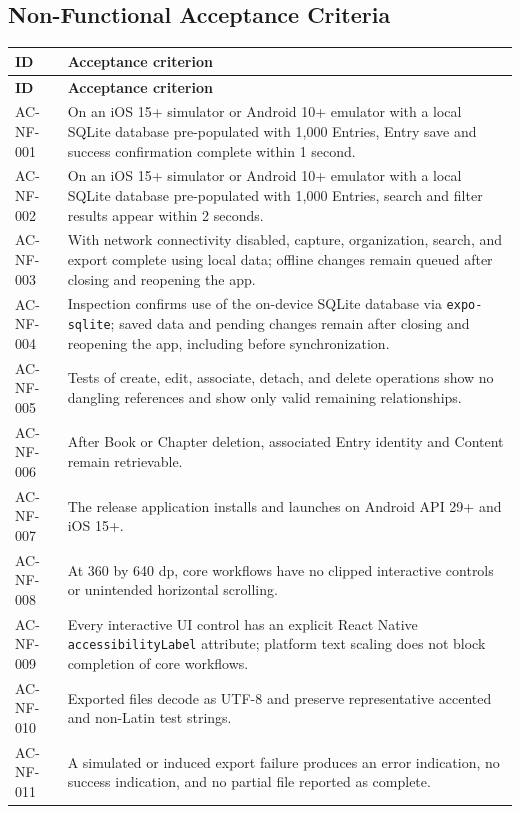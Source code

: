 \documentclass[11pt,a4paper]{article}
\begin{document}
\subsection{Non-Functional Acceptance Criteria}
\begin{longtable}{|L{2.5cm}|L{13.5cm}|}
\hline \textbf{ID} & \textbf{Acceptance criterion} \\
\hline
\endfirsthead
\hline \textbf{ID} & \textbf{Acceptance criterion} \\
\hline
\endhead
AC-NF-001 & On an iOS 15+ simulator or Android 10+ emulator with a local SQLite database pre-populated with 1,000 Entries, Entry save and success confirmation complete within 1 second. \\ \hline
AC-NF-002 & On an iOS 15+ simulator or Android 10+ emulator with a local SQLite database pre-populated with 1,000 Entries, search and filter results appear within 2 seconds. \\ \hline
AC-NF-003 & With network connectivity disabled, capture, organization, search, and export complete using local data; offline changes remain queued after closing and reopening the app. \\ \hline
AC-NF-004 & Inspection confirms use of the on-device SQLite database via \texttt{expo-sqlite}; saved data and pending changes remain after closing and reopening the app, including before synchronization. \\ \hline
AC-NF-005 & Tests of create, edit, associate, detach, and delete operations show no dangling references and show only valid remaining relationships. \\ \hline
AC-NF-006 & After Book or Chapter deletion, associated Entry identity and Content remain retrievable. \\ \hline
AC-NF-007 & The release application installs and launches on Android API 29+ and iOS 15+. \\ \hline
AC-NF-008 & At 360 by 640 dp, core workflows have no clipped interactive controls or unintended horizontal scrolling. \\ \hline
AC-NF-009 & Every interactive UI control has an explicit React Native \texttt{accessibilityLabel} attribute; platform text scaling does not block completion of core workflows. \\ \hline
AC-NF-010 & Exported files decode as UTF-8 and preserve representative accented and non-Latin test strings. \\ \hline
AC-NF-011 & A simulated or induced export failure produces an error indication, no success indication, and no partial file reported as complete. \\ \hline

\end{longtable}
\end{document}
